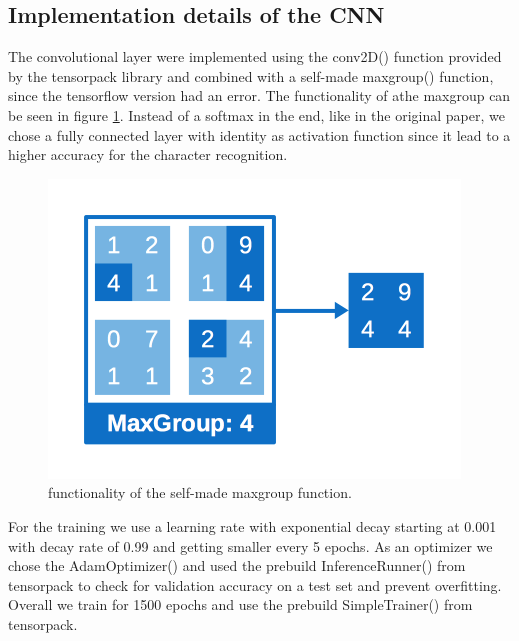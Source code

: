 \documentclass{utue} %
\begin{document}
\subsection{Implementation details of the CNN}
The convolutional layer were implemented using the conv2D() function provided by the tensorpack library and combined with a self-made maxgroup() function, since the tensorflow version had an error. The functionality of athe maxgroup can be seen in figure \ref{fig:impl_maxgroup}. Instead of a softmax in the end, like in the original paper, we chose a fully connected layer with identity as activation function since it lead to a higher accuracy for the character recognition. \\
\begin{figure}[h!]
	\centering
	\includegraphics[width=.9\columnwidth]{graphics/impl_maxgroups.png}
	\caption{\label{fig:impl_maxgroup} \footnotesize{functionality of the self-made maxgroup function.}}
\end{figure}

For the training we use a learning rate with exponential decay starting at 0.001 with decay rate of 0.99 and getting smaller every 5 epochs. As an optimizer we chose the AdamOptimizer() and used the prebuild InferenceRunner() from tensorpack to check for validation accuracy on a test set and prevent overfitting. Overall we train for 1500 epochs and use the prebuild SimpleTrainer() from tensorpack. 
\end{document}
